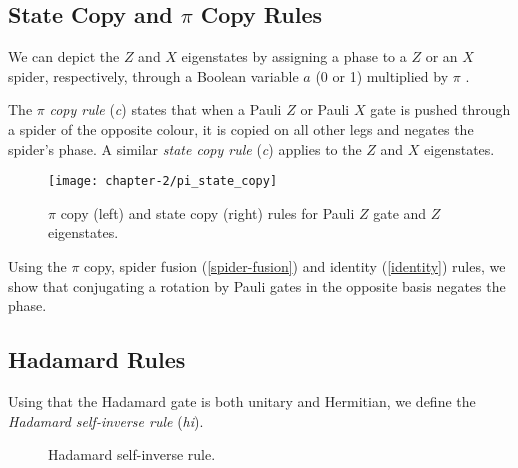 

\subsection{State Copy and $\pi$ Copy Rules}%

We can depict the $Z$ and $X$ eigenstates by assigning a phase to a $Z$ or an $X$ spider, respectively, through a Boolean variable $a$ (0 or 1) multiplied by $\pi$ \cite{Wetering2020}.

%

The $\pi$ \textit{copy rule} (\textit{c}) states that when a Pauli $Z$ or Pauli $X$ gate is pushed through a spider of the opposite colour, it is copied on all other legs and negates the spider's phase. A similar \textit{state copy rule} (\textit{c}) applies to the $Z$ and $X$ eigenstates.

\begin{figure}[H]
    \centering
    \texttt{[image: chapter-2/pi\_state\_copy]}
    \caption{$\pi$ copy (left) and state copy (right) rules for Pauli $Z$ gate and $Z$ eigenstates.}
    \label{state-copy}
    \label{pi-copy}
\end{figure}

Using the $\pi$ copy, spider fusion (\ref{spider-fusion}) and identity (\ref{identity}) rules, we show that conjugating a rotation by Pauli gates in the opposite basis negates the phase.



\subsection{Hadamard Rules}

Using that the Hadamard gate is both unitary and Hermitian, we define the \textit{Hadamard self-inverse rule} (\textit{hi}).

\begin{figure}[H]
    \centering
    \caption{Hadamard self-inverse rule.}
    \label{hadamard-self-inverse}
\end{figure}


